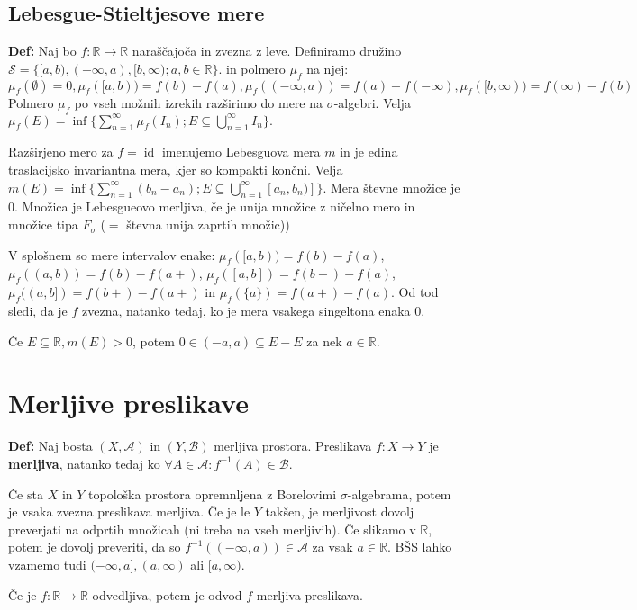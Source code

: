 \documentclass[a4paper,oneside,10pt]{article}
\theoremstyle{definition}
\newcommand{\R}{\ensuremath{\mathbb{R}}}
\newcommand{\A}{\ensuremath{\mathcal{A}}}
\newcommand{\B}{\ensuremath{\mathcal{B}}}
\renewcommand{\S}{\ensuremath{\mathcal{S}}}
\begin{document}
\subsection*{Lebesgue-Stieltjesove mere}
\textbf{Def:} Naj bo $f\colon\R\to\R$ naraščajoča in zvezna z leve.
Definiramo družino $\S = \{[a, b), (-\infty, a), [b, \infty); a, b \in \R \}$.
in polmero $\mu_f$ na njej: $\mu_f(\emptyset) = 0, \mu_f([a, b)) = f(b) - f(a),
\mu_f((-\infty, a)) = f(a) - f(-\infty), \mu_f([b, \infty)) = f(\infty) - f(b)$ \\
Polmero $\mu_f$ po vseh možnih izrekih razširimo do mere na $\sigma$-algebri.
Velja
$\mu_{f}(E) = \inf \{ \sum_{n = 1}^\infty \mu_{f}(I_n); E \subseteq
\bigcup_{n=1}^\infty I_n \}.$

Razširjeno mero za $f = \operatorname{id}$ imenujemo Lebesguova mera $m$ in
je edina traslacijsko invariantna mera, kjer so kompakti končni. Velja
$m(E) = \inf \{ \sum_{n = 1}^\infty (b_n - a_n); E \subseteq
\bigcup_{n=1}^\infty [a_n, b_n)] \}.$ Mera števne množice je 0. Množica je
Lebesgueovo merljiva, če je unija množice z ničelno mero in množice tipa
$F_{\sigma}$ ($=$ števna unija zaprtih množic))

V splošnem so mere intervalov enake:
$\mu_f([a, b)) = f(b) - f(a)$,
$\mu_f((a, b)) = f(b) - f(a+)$,
$\mu_f([a, b]) = f(b+) - f(a)$,
$\mu_f((a, b]) = f(b+) - f(a+)$ in
$\mu_f(\{a\}) = f(a+) - f(a)$.
Od tod sledi, da je $f$ zvezna, natanko tedaj, ko je mera vsakega singeltona
enaka 0.

Če $E \subseteq \R, m(E) > 0$, potem $0 \in (-a, a) \subseteq E - E$ za nek $a
\in \R$.

\section*{Merljive preslikave}
\textbf{Def:} Naj bosta $(X, \A)$ in $(Y, \B)$ merljiva prostora.  Preslikava
$f\colon X \to Y$ je \textbf{merljiva}, natanko tedaj ko $\forall A \in \A:
f^{-1}(A) \in \B$.

Če sta $X$ in $Y$ topološka prostora opremnljena z Borelovimi
$\sigma$-algebrama, potem je vsaka zvezna preslikava merljiva. Če je le $Y$
takšen, je merljivost dovolj preverjati na odprtih množicah (ni treba na vseh
merljivih). Če slikamo v $\R$, potem je dovolj preveriti, da so $f^{-1}
((-\infty, a)) \in \A$ za vsak $a \in \R$. BŠS lahko vzamemo tudi $(-\infty, a],
(a, \infty)$ ali $[a, \infty).$

Če je $f\colon\R\to\R$ odvedljiva, potem je odvod $f$ merljiva preslikava.
\end{document}

